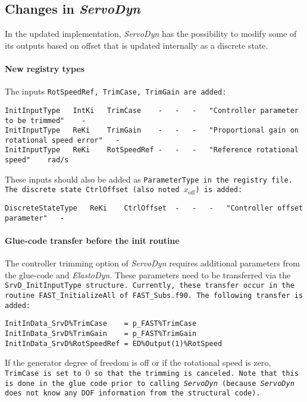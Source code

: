 \documentclass[11pt]{article}
\begin{document}
\subsection{Changes in \textit{ServoDyn}}
\label{sec:changesservodyn}
In the updated implementation, \textit{ServoDyn} has the possibility to modify some of its outputs based on offset that is updated internally as a discrete state.

\paragraph{New registry types}
The inputs \tt{RotSpeedRef}, \tt{TrimCase}, \tt{TrimGain} are added: 
\fortran
\begin{lstlisting}
InitInputType	IntKi	TrimCase	-	-	-	"Controller parameter to be trimmed"	-
InitInputType	ReKi	TrimGain	-	-	-	"Proportional gain on rotational speed error"	-
InitInputType	ReKi	RotSpeedRef	-	-	-	"Reference rotational speed"	rad/s
\end{lstlisting}
These inputs should also be added as \tt{ParameterType} in the registry file.
The discrete state \tt{CtrlOffset} (also noted $x_\text{off}$) is added: 
\begin{lstlisting}
DiscreteStateType	ReKi	CtrlOffset	-	-	-	"Controller offset parameter"	-
\end{lstlisting}


\paragraph{Glue-code transfer before the init routine}
The controller trimming option of \textit{ServoDyn} requires additional parameters from the glue-code and \textit{ElastoDyn}. These parameters need to be transferred via the \tt{SrvD\_InitInputType} structure.
Currently, these transfer occur in the routine \tt{FAST\_InitializeAll} of \tt{FAST\_Subs.f90}. 
The following transfer is added: 
\fortran
\begin{lstlisting}
InitInData_SrvD%TrimCase    = p_FAST%TrimCase
InitInData_SrvD%TrimGain    = p_FAST%TrimGain
InitInData_SrvD%RotSpeedRef = ED%Output(1)%RotSpeed
\end{lstlisting}
If the generator degree of freedom is off or if the rotational speed is zero, \tt{TrimCase} is set to $0$ so that the trimming is canceled.
Note that this is done in the glue code prior to calling \textit{ServoDyn} (because \textit{ServoDyn} does not know any DOF information from
the structural code).
\end{document}
